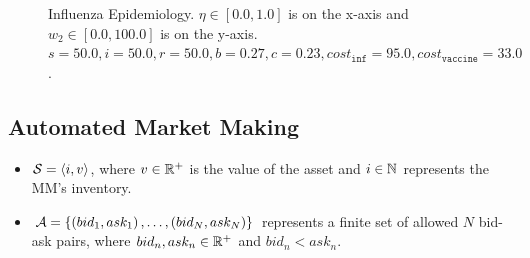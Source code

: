 \begin{figure}[h!]
    \centering
    \caption{Influenza Epidemiology. $ \eta \in \left[ 0.0, 1.0 \right]$ is on the x-axis and $ w_2 \in \left[ 0.0, 100.0 \right]$ is on the y-axis. $ s = 50.0, i = 50.0, r = 50.0, b = 0.27, c = 0.23, cost_{\mathtt{inf}} = 95.0, cost_{\mathtt{vaccine}} = 33.0$.}
    \label{fig:robot1d}
\end{figure}

\subsection{Automated Market Making}
\label{sec:results_mm}

\begin{itemize}
    \item {\footnotesize $\mathcal{S} = \left\langle i, v\right\rangle$}, where {\footnotesize $v \in \mathbb{R}^{+}$} is the value of the asset and {\footnotesize $i \in \mathbb{N}$} represents the MM's inventory.
    \item {\footnotesize $\mathcal{A} = \left\lbrace \left(bid_1, ask_1\right), \ldots,
        \left(bid_N, ask_N\right) \right\rbrace$} represents a finite set of allowed $N$ bid-ask pairs, where {\footnotesize $bid_n, ask_n \in \mathbb{R}^{+}$} and {\footnotesize $bid_n < ask_n$}. 
\end{itemize}      

